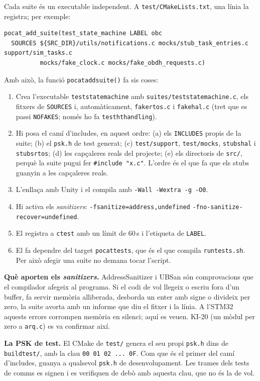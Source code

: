 \documentclass[11pt,a4paper]{article}
\DeclareRobustCommand{\_}{\textunderscore\allowbreak}
\newcommand{\cd}[1]{\texttt{#1}}
\begin{document}
Cada suite és un executable independent. A \cd{test/CMakeLists.txt}, una línia la
registra; per exemple:
\begin{lstlisting}
pocat_add_suite(test_state_machine LABEL obc
  SOURCES ${SRC_DIR}/utils/notifications.c mocks/stub_task_entries.c support/sim_tasks.c
          mocks/fake_clock.c mocks/fake_obdh_requests.c)
\end{lstlisting}
Amb això, la funció \cd{pocat\_add\_suite()} fa sis coses:
\begin{enumerate}
\item Crea l'executable \cd{test\_state\_machine} amb \cd{suites/test\_state\_machine.c}, els
  fitxers de \cd{SOURCES} i, automàticament, \cd{fake\_rtos.c} i \cd{fake\_hal.c} (tret que
  es passi \cd{NO\_FAKES}; només ho fa \cd{test\_ht\_handling}).
\item Hi posa el camí d'includes, en aquest ordre: (a) els \cd{INCLUDES} propis de la
  suite; (b) el \cd{psk.h} de test generat; (c) \cd{test/support}, \cd{test/mocks},
  \cd{stubs\_hal} i \cd{stubs\_rtos}; (d) les capçaleres reals del projecte; (e) els
  directoris de \cd{src/}, perquè la suite pugui fer \cd{\#include "x.c"}. L'ordre és el
  que fa que els stubs guanyin a les capçaleres reals.
\item L'enllaça amb Unity i el compila amb \cd{-Wall -Wextra -g -O0}.
\item Hi activa els \emph{sanitizers}: \cd{-fsanitize=address,undefined}
  \cd{-fno-sanitize-recover=undefined}.
\item El registra a \cd{ctest} amb un límit de 60\,s i l'etiqueta de \cd{LABEL}.
\item El fa dependre del target \cd{pocat\_tests}, que és el que compila \cd{run\_tests.sh}.
  Per això afegir una suite no demana tocar l'script.
\end{enumerate}

\textbf{Què aporten els \emph{sanitizers}.} AddressSanitizer i UBSan són comprovacions que
el compilador afegeix al programa. Si el codi de vol llegeix o escriu fora d'un buffer,
fa servir memòria alliberada, desborda un enter amb signe o divideix per zero, la suite
avorta amb un informe que diu el fitxer i la línia. A l'STM32 aquests errors corrompen
memòria en silenci; aquí es veuen. KI-20 (un mòdul per zero a \cd{arq.c}) es va confirmar
així.

\textbf{La PSK de test.} El CMake de \cd{test/} genera el seu propi \cd{psk.h} dins de
\cd{build\_test/}, amb la clau \cd{00 01 02 ... 0F}. Com que és el primer del camí
d'includes, guanya a qualsevol \cd{psk.h} de desenvolupament. Les trames dels tests de
comms es signen i es verifiquen de debò amb aquesta clau, que no és la de vol.
\end{document}
